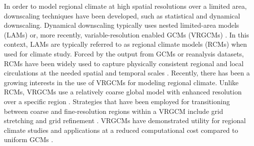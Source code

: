 \documentclass[draft,ms]{agutex}   %
\begin{document}
\begin{article}
In order to model regional climate at high spatial resolutions over a limited area, downscaling techniques have been developed, such as statistical and dynamical downscaling. Dynamical downscaling typically uses nested limited-area models (LAMs) or, more recently, variable-resolution enabled GCMs (VRGCMs) \citep{laprise2008regional}. In this context, LAMs are typically referred to as regional climate models (RCMs) when used for climate study. Forced by the output from GCMs or reanalysis datasets, RCMs have been widely used to capture physically consistent regional and local circulations at the needed spatial and temporal scales \citep{christensen2007regional, bukovsky2009precipitation, mearns2012north}. Recently, there has been a growing interests in the use of VRGCMs for modeling regional climate. Unlike RCMs, VRGCMs use a relatively coarse global model with enhanced resolution over a specific region \citep{staniforth1978variable, fox1997finite}.  Strategies that have been employed for transitioning between coarse and fine-resolution regions within a VRGCM include grid stretching \citep{fox1997finite, mcgregor2008updated} and grid refinement \citep{ringler2008multiresolution, skamarock2012multiscale, zarzycki2014aquaplanet}. VRGCMs have demonstrated utility for regional climate studies and applications at a reduced computational cost compared to uniform GCMs \citep{fox2006variable, rauscher2013exploring, zarzycki2015effects}. 


\end{article}
\end{document}
